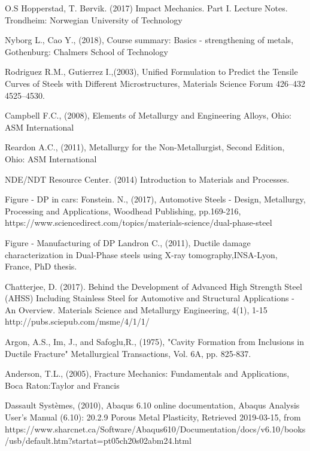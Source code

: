 \documentclass{article}
\begin{document}
\begin{thebibliography}{22}
O.S Hopperstad, T. Børvik. (2017) Impact Mechanics. Part I. Lecture Notes. Trondheim: Norwegian University of Technology

Nyborg L., Cao Y., (2018), Course summary: Basics - strengthening of metals, Gothenburg: Chalmers School of Technology


Rodriguez R.M., Gutierrez I.,(2003), Unified Formulation to Predict the Tensile Curves of Steels with Different Microstructures, Materials Science Forum 426–432  4525–4530.


Campbell F.C., (2008), Elements of Metallurgy and Engineering Alloys, Ohio: ASM International

Reardon A.C., (2011), Metallurgy for the Non-Metallurgist, Second Edition, Ohio: ASM International

NDE/NDT Resource Center. (2014) Introduction to Materials and Processes. %

Figure - DP in cars:
Fonstein. N., (2017), Automotive Steels - Design, Metallurgy, Processing and Applications, Woodhead Publishing, pp.169-216, https://www.sciencedirect.com/topics/materials-science/dual-phase-steel


Figure - Manufacturing of DP
Landron C., (2011), Ductile damage characterization in Dual-Phase steels using X-ray tomography,INSA-Lyon, France, PhD thesis.

Chatterjee, D. (2017). Behind the Development of Advanced High Strength Steel (AHSS) Including Stainless Steel for Automotive and Structural Applications - An Overview. Materials Science and Metallurgy Engineering, 4(1), 1-15
http://pubs.sciepub.com/msme/4/1/1/

Argon, A.S., Im, J., and Safoglu,R., (1975), "Cavity Formation from Inclusions in Ductile Fracture" Metallurgical Transactions, Vol. 6A, pp. 825-837.

Anderson, T.L., (2005), Fracture Mechanics: Fundamentals and Applications, Boca Raton:Taylor and Francis

Dassault Systèmes, (2010), Abaqus 6.10 online documentation, Abaqus Analysis User's Manual (6.10): 20.2.9 Porous Metal Plasticity, Retrieved 2019-03-15, from https://www.sharcnet.ca/Software/Abaqus610/Documentation/docs/v6.10/books/usb/default.htm?startat=pt05ch20s02abm24.html


\end{thebibliography}
\end{document}
